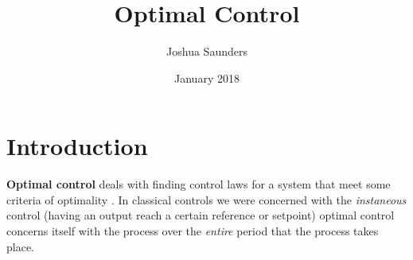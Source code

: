 \documentclass{article}
\title{Optimal Control}
\author{Joshua Saunders}
\date{January 2018}
\begin{document}
\maketitle

\section{Introduction}
\textbf{Optimal control} deals with finding control laws for a system that meet 
some criteria of optimality \cite{wiki:1}. In classical controls we were 
concerned with the \textit{instaneous} control (having an output reach a
certain reference or setpoint) optimal control concerns itself with the
process over the \textit{entire} period that the process takes place.



\end{document}
